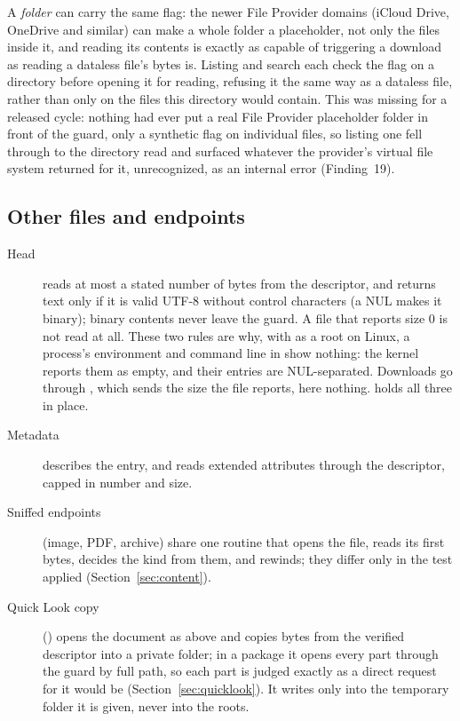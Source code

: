 A \emph{folder} can carry the same flag: the newer File Provider domains (iCloud Drive,
OneDrive and similar) can make a whole folder a placeholder, not only the files inside
it, and reading its contents is exactly as capable of triggering a download as reading a
dataless file's bytes is.  Listing and search each check the flag on a directory before
opening it for reading, refusing it the same way as a dataless file, rather than only on
the files this directory would contain.  This was missing for a released cycle: nothing
had ever put a real File Provider placeholder folder in front of the guard, only a
synthetic flag on individual files, so listing one fell through to the directory read and
surfaced whatever the provider's virtual file system returned for it, unrecognized, as an
internal error (Finding~19).

\subsection{Other files and endpoints}

\begin{description}
  \item[Head] reads at most a stated number of bytes from the descriptor, and returns
        text only if it is valid UTF-8 without control characters (a NUL makes it
        binary); binary contents never leave the guard.  A file that reports size 0 is not
        read at all.  These two rules are why, with \code{/} as a root on Linux, a
        process's environment and command line in  show nothing: the kernel
        reports them as empty, and their entries are NUL-separated.  Downloads go
        through , which sends the size the file reports, here
        nothing.   holds all three in
        place.
  \item[Metadata] describes the entry, and reads extended attributes through the
        descriptor, capped in number and size.
  \item[Sniffed endpoints] (image, PDF, archive) share one routine that opens the file,
        reads its first bytes, decides the kind from them, and rewinds; they differ only
        in the test applied (Section~\ref{sec:content}).
  \item[Quick Look copy] () opens the document as above and copies
        bytes from the verified descriptor into a private folder; in a package it opens every
        part through the guard by full path, so each part is judged exactly as a direct
        request for it would be (Section~\ref{sec:quicklook}).  It writes only into the
        temporary folder it is given, never into the roots.
\end{description}


